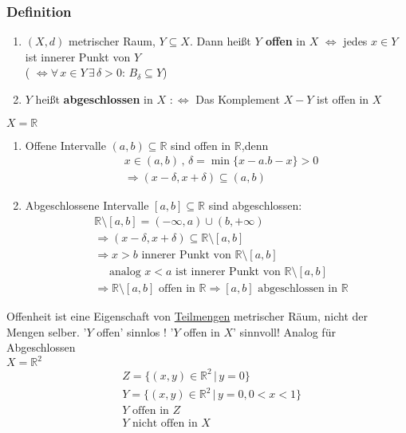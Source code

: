 \subsubsection[Offen, Abgeschlossen]{Definition} %
\label{ssub:definition}
\begin{enumerate}
	\item $(X,d)$ metrischer Raum, $Y \subseteq X$. Dann heißt {\bfseries $Y$ offen} in $X$ $\Leftrightarrow $ jedes $x \in Y$ ist innerer Punkt von $Y$ \\
	( $\Leftrightarrow \forall\, x \in Y \, \exists \, \delta >0: \, B_{\delta } \subseteq Y$)
	\item $Y$ heißt {\bfseries abgeschlossen} in $X$ $:\Leftrightarrow $ Das Komplement $X-Y$ ist offen in $X$
\end{enumerate}
 $X = \mathbb{R}$
 \begin{enumerate}
 	\item Offene Intervalle $(a,b) \subseteq \mathbb{R}$ sind offen in $\mathbb{R}$,denn
  \begin{align*}
  	&x \in (a,b) \,,\, \delta = \min \{ x-a.b-x \} >0 \\
	&\Rightarrow (x-\delta ,x+\delta ) \subseteq (a,b)
  \end{align*}  
  
 \item Abgeschlossene Intervalle $[a,b] \subseteq \mathbb{R}$ sind abgeschlossen: 
 \begin{align*}
 	&\mathbb{R} \setminus [a,b] = (-\infty,a) \cup (b, +\infty) \\
 	&\Rightarrow (x-\delta ,x+\delta ) \subseteq \mathbb{R} \setminus [a,b] \\
	&\Rightarrow x>b \text{ innerer Punkt von } \mathbb{R} \setminus[a,b] \\
	&\quad \text{ analog } x<a \text{ ist innerer Punkt von } \mathbb{R}\setminus[a,b] \\
	&\Rightarrow \mathbb{R}\setminus[a,b] \text{ offen in } \mathbb{R} \Rightarrow  [a,b] \text{ abgeschlossen in } \mathbb{R} 
\end{align*}
\end{enumerate}

Offenheit ist eine Eigenschaft von \underline{Teilmengen} metrischer Räum, nicht der Mengen selber. '$Y$ offen' sinnlos ! '$Y$ offen in $X$' sinnvoll! Analog für Abgeschlossen 
 \\
$X = \mathbb{R}^2$ \\
\begin{align*}
	&Z = \{ (x,y) \in \mathbb{R}^2\, |\, y=0 \} \\
	&Y = \{ (x,y) \in \mathbb{R}^2 \, | \, y=0,0<x<1 \} \\
	&Y \text{ offen in } Z \\
	&Y \text{ nicht offen in } X \\
	\end{align*}

